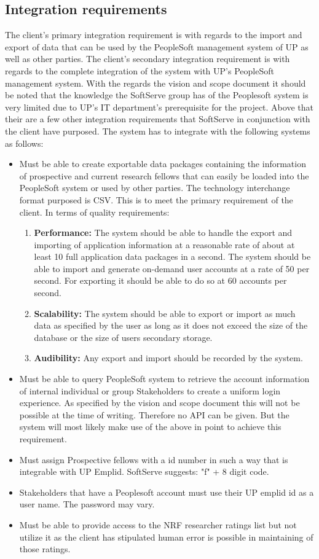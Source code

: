 \documentclass[12pt]{article}
\begin{document}
\subsection{Integration requirements}
\vspace{0.2in}
The client's primary integration requirement is with regards to the import and export of data that can be used by the PeopleSoft management system of UP as well as other parties. The client's secondary integration requirement is with regards to the complete integration of the system with UP's PeopleSoft management system. With the regards the vision and scope document it should be noted that the knowledge the SoftServe group has of the Peoplesoft system is very limited due to UP's IT department's prerequisite for the project. Above that their are a few other integration requirements that SoftServe in conjunction with the client have purposed. The system has to integrate with the following systems as follows:
\begin{itemize}
	\item Must be able to create exportable data packages containing the information of prospective and current research fellows that can easily be loaded into the PeopleSoft system or used by other parties. The technology interchange format purposed is CSV. This is to meet the primary requirement of the client. In terms of quality requirements:
	\begin{enumerate}
		\item \textbf{Performance:} The system should be able to handle the export and importing of application information at a reasonable rate of about at least 10 full application data packages in a second. The system should be able to import and generate on-demand user accounts at a rate of 50 per second. For exporting it should be able to do so at 60 accounts per second.
		\item \textbf{Scalability:} The system should be able to export or import as much data as specified by the user as long as it does not exceed the size of the database or the size of users secondary storage. 
		\item \textbf{Audibility:} Any export and import should be recorded by the system.
	\end{enumerate}  
	\item Must be able to query PeopleSoft system to retrieve the account information of internal individual or group Stakeholders to create a uniform login experience. As specified by the vision and scope document this will not be possible at the time of writing. Therefore no API can be given. But the system will most likely make use of the above in point to achieve this requirement. 
	\item Must assign Prospective fellows with a id number in such a way that is integrable with UP Emplid. SoftServe suggests: "f" + 8 digit code.
	\item Stakeholders that have a Peoplesoft account must use their UP emplid id as a user name. The password may vary.
	\item Must be able to provide access to the NRF researcher ratings list but not utilize it as the client has stipulated human error is possible in maintaining of those ratings.
\end{itemize}
\end{document}
